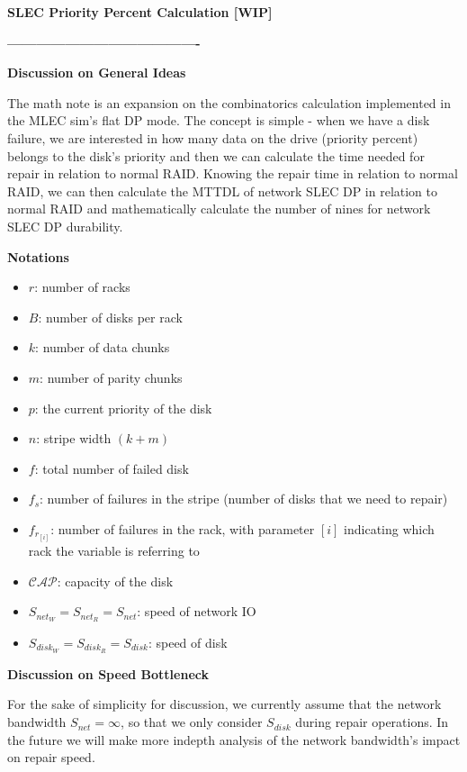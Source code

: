 \documentclass[journal]{IEEEtran}
\begin{document}
\textbf{SLEC Priority Percent Calculation [WIP]}

\textbf{----------------------------------------}

\textbf{Discussion on General Ideas}

The math note is an expansion on the combinatorics calculation implemented in the MLEC sim's flat DP mode. The concept is simple - when we have a disk failure, we are interested in how many data on the drive (priority percent) belongs to the disk's priority and then we can calculate the time needed for repair in relation to normal RAID. Knowing the repair time in relation to normal RAID, we can then calculate the MTTDL of network SLEC DP in relation to normal RAID and mathematically calculate the number of nines for network SLEC DP durability.\

\hspace*{1cm}

\textbf{Notations}

\begin{itemize}
  \item $r$: number of racks
  \item $B$: number of disks per rack
  \item $k$: number of data chunks
  \item $m$: number of parity chunks
  \item $p$: the current priority of the disk
  \item $n$: stripe width $(k+m)$
  \item $f$: total number of failed disk
  \item $f_s$: number of failures in the stripe (number of disks that we need to repair)
  \item $f_{r_[i]}$: number of failures in the rack, with parameter $[i]$ indicating which rack the variable is referring to
  \item $\mathcal{CAP}$: capacity of the disk
  \item $S_{net_W}=S_{net_R}=S_{net}$: speed of network IO
  \item $S_{disk_W}=S_{disk_R}=S_{disk}$: speed of disk
\end{itemize}

\hspace*{1cm}

\textbf{Discussion on Speed Bottleneck}

For the sake of simplicity for discussion, we currently assume that the network bandwidth $S_{net}=\infty$, so that we only consider $S_{disk}$ during repair operations. In the future we will make more indepth analysis of the network bandwidth's impact on repair speed.
\end{document}

